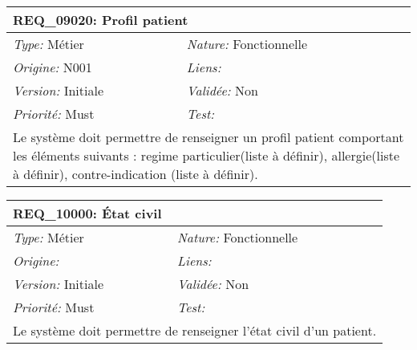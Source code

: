 \begin{table}[!ht]

\begin{tabular}{|p{60mm}p{100mm}|}

\hline

\multicolumn{2}{|l|}{\textbf{REQ\_09020:} Profil patient} \\ \hline

\emph{Type:} Métier & \emph{Nature:} Fonctionnelle \\

\emph{Origine:} N001 & \emph{Liens:}  \\

\emph{Version:} Initiale & \emph{Validée:} Non \\

\emph{Priorité:} Must & \emph{Test:} \\ \hline

\multicolumn{2}{|p{16cm}|}{Le système doit permettre de renseigner un profil patient comportant les éléments suivants : regime particulier(liste à définir), allergie(liste à définir), contre-indication (liste à définir).} \\ \hline

\end{tabular}

\end{table}



\begin{table}[!ht]

\begin{tabular}{|p{60mm}p{100mm}|}

\hline

\multicolumn{2}{|l|}{\textbf{REQ\_10000:} État civil} \\ \hline

\emph{Type:} Métier & \emph{Nature:} Fonctionnelle \\

\emph{Origine:}  & \emph{Liens:}  \\

\emph{Version:} Initiale & \emph{Validée:} Non \\

\emph{Priorité:} Must & \emph{Test:} \\ \hline

\multicolumn{2}{|p{16cm}|}{Le système doit permettre de renseigner l'état civil d'un patient.} \\ \hline

\end{tabular}

\end{table}




